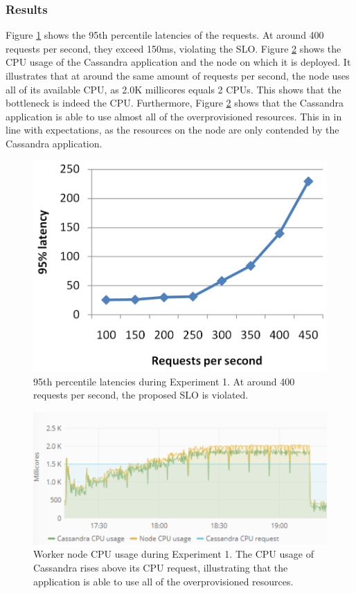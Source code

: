 \subsubsection{Results}
Figure \ref{fig:lat-cas-li} shows the 95th percentile latencies of the requests. At around 400 requests per second, they exceed 150ms, violating the SLO. Figure \ref{fig:cpu-cas-li} shows the CPU usage of the Cassandra application and the node on which it is deployed. It illustrates that at around the same amount of requests per second, the node uses all of its available CPU, as 2.0K millicores equals 2 CPUs. This shows that the bottleneck is indeed the CPU. Furthermore, Figure \ref{fig:cpu-cas-li} shows that the Cassandra application is able to use almost all of the overprovisioned resources. This in in line with expectations, as the resources on the node are only contended by the Cassandra application.

\begin{figure}
\centering
\includegraphics[width=0.80\columnwidth]{Images/Experiments/CPU/Latencies/cas-li.PNG}
\caption{95th percentile latencies during Experiment 1. At around 400 requests per second, the proposed SLO is violated.}
\label{fig:lat-cas-li} 
\end{figure}

\begin{figure}
\centering
\includegraphics[width=0.80\columnwidth]{Images/Experiments/CPU/Grafana/cpu-cas-li.PNG}
\caption{Worker node CPU usage during Experiment 1. The CPU usage of Cassandra rises above its CPU request, illustrating that the application is able to use all of the overprovisioned resources.}
\label{fig:cpu-cas-li} 
\end{figure}

